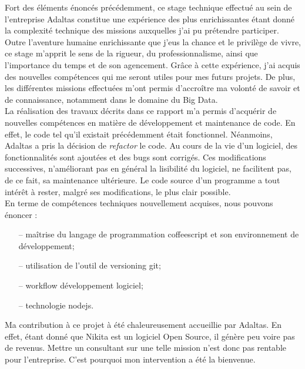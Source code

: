 \documentclass[12pt, french]{report}
\begin{document}
Fort des éléments énoncés précédemment, ce stage technique effectué au sein de l’entreprise Adaltas constitue une expérience des plus enrichissantes étant donné la complexité technique des missions auxquelles j'ai pu prétendre participer. Outre l’aventure humaine enrichissante que j’eus la chance et le privilège de vivre, ce stage m’apprit le sens de la rigueur, du professionnalisme, ainsi que l’importance du temps et de son agencement. Grâce à cette expérience, j’ai acquis des nouvelles compétences qui me seront utiles pour mes futurs projets. De plus, les différentes missions effectuées m’ont permis d’accroître ma volonté de savoir et de connaissance, notamment dans le domaine du Big Data.\\

La réalisation des travaux décrits dans ce rapport m'a permis d'acquérir de nouvelles compétences en matière de développement et maintenance de code. En effet, le code tel qu'il existait précédemment était fonctionnel. Néanmoins, Adaltas a pris la décision de \textit{refactor} le code. Au cours de la vie d'un logiciel, des fonctionnalités sont ajoutées et des bugs sont corrigés. Ces modifications successives, n'améliorant pas en général la lisibilité du logiciel, ne facilitent pas, de ce fait, sa maintenance ultérieure. Le code source d'un programme a tout intérêt à rester, malgré ses modifications, le plus clair possible.\\

En terme de compétences techniques nouvellement acquises, nous pouvons énoncer :

\begin{itemize}
\item [--] maîtrise du langage de programmation \gls{coffeescript} et son environnement de développement;
\item [--] utilisation de l'outil de versioning \gls{git};
\item [--] workflow développement logiciel;
\item [--] technologie \gls{nodejs}.\\
\end{itemize}

Ma contribution à ce projet à été chaleureusement accueillie par Adaltas. En effet, étant donné que Nikita est un logiciel Open Source, il génère peu voire pas de revenus. Mettre un consultant sur une telle mission n'est donc pas rentable pour l'entreprise. C'est pourquoi mon intervention a été la bienvenue.

\clearpage
\end{document}
